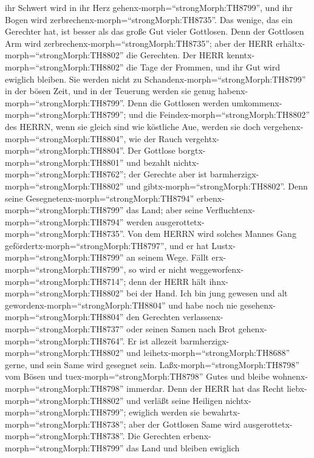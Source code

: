 ihr Schwert wird in ihr Herz gehenx-morph=``strongMorph:TH8799'', und
ihr Bogen wird zerbrechenx-morph=``strongMorph:TH8735''. 
Das wenige, das ein Gerechter hat, ist besser als das große Gut vieler
Gottlosen.  Denn der Gottlosen Arm wird
zerbrechenx-morph=``strongMorph:TH8735''; aber der HERR
erhältx-morph=``strongMorph:TH8802'' die Gerechten.  Der
HERR kenntx-morph=``strongMorph:TH8802'' die Tage der Frommen, und ihr
Gut wird ewiglich bleiben.  Sie werden nicht zu
Schandenx-morph=``strongMorph:TH8799'' in der bösen Zeit, und in der
Teuerung werden sie genug habenx-morph=``strongMorph:TH8799''.
 Denn die Gottlosen werden
umkommenx-morph=``strongMorph:TH8799''; und die
Feindex-morph=``strongMorph:TH8802'' des HERRN, wenn sie gleich sind wie
köstliche Aue, werden sie doch vergehenx-morph=``strongMorph:TH8804'',
wie der Rauch vergehtx-morph=``strongMorph:TH8804''.  Der
Gottlose borgtx-morph=``strongMorph:TH8801'' und bezahlt
nichtx-morph=``strongMorph:TH8762''; der Gerechte aber ist
barmherzigx-morph=``strongMorph:TH8802'' und
gibtx-morph=``strongMorph:TH8802''.  Denn seine
Gesegnetenx-morph=``strongMorph:TH8794''
erbenx-morph=``strongMorph:TH8799'' das Land; aber seine
Verfluchtenx-morph=``strongMorph:TH8794'' werden
ausgerottetx-morph=``strongMorph:TH8735''.  Von dem HERRN
wird solches Mannes Gang gefördertx-morph=``strongMorph:TH8797'', und er
hat Lustx-morph=``strongMorph:TH8799'' an seinem Wege. 
Fällt erx-morph=``strongMorph:TH8799'', so wird er nicht
weggeworfenx-morph=``strongMorph:TH8714''; denn der HERR hält
ihnx-morph=``strongMorph:TH8802'' bei der Hand.  Ich bin
jung gewesen und alt gewordenx-morph=``strongMorph:TH8804'' und habe
noch nie gesehenx-morph=``strongMorph:TH8804'' den Gerechten
verlassenx-morph=``strongMorph:TH8737'' oder seinen Samen nach Brot
gehenx-morph=``strongMorph:TH8764''.  Er ist allezeit
barmherzigx-morph=``strongMorph:TH8802'' und
leihetx-morph=``strongMorph:TH8688'' gerne, und sein Same wird gesegnet
sein.  Laßx-morph=``strongMorph:TH8798'' vom Bösen und
tuex-morph=``strongMorph:TH8798'' Gutes und bleibe
wohnenx-morph=``strongMorph:TH8798'' immerdar.  Denn der
HERR hat das Recht liebx-morph=``strongMorph:TH8802'' und verläßt seine
Heiligen nichtx-morph=``strongMorph:TH8799''; ewiglich werden sie
bewahrtx-morph=``strongMorph:TH8738''; aber der Gottlosen Same wird
ausgerottetx-morph=``strongMorph:TH8738''.  Die Gerechten
erbenx-morph=``strongMorph:TH8799'' das Land und bleiben ewiglich
